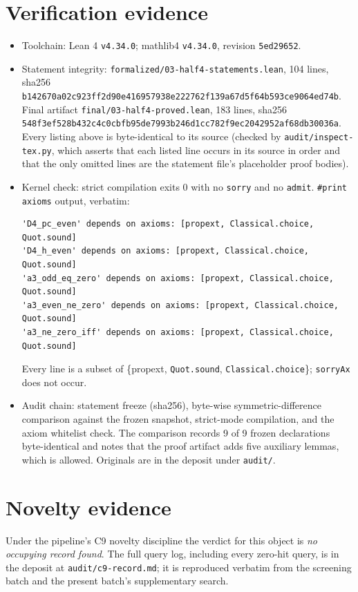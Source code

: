 \documentclass[11pt]{article}
\begin{document}
\section{Verification evidence}
\label{sec:verif}
\begin{itemize}
\item Toolchain: Lean 4 \texttt{v4.34.0}; mathlib4 \texttt{v4.34.0}, revision \texttt{5ed29652}.
\item Statement integrity: \texttt{formalized/03-half4-statements.lean}, 104 lines,
sha256 \texttt{b142670a02c923ff2d90e416957938e222762f139a67d5f64b593ce9064ed74b}.
Final artifact \texttt{final/03-half4-proved.lean}, 183 lines,
sha256 \texttt{548f3ef528b432c4c0cbfb95de7993b246d1cc782f9ec2042952af68db30036a}.
Every listing above is byte-identical to its source (checked by \texttt{audit/inspect-tex.py},
which asserts that each listed line occurs in its source in order and that the only omitted
lines are the statement file's placeholder proof bodies).
\item Kernel check: strict compilation exits 0 with no \texttt{sorry} and no \texttt{admit}.
\texttt{\#print axioms} output, verbatim:
\begin{verbatim}
'D4_pc_even' depends on axioms: [propext, Classical.choice, Quot.sound]
'D4_h_even' depends on axioms: [propext, Classical.choice, Quot.sound]
'a3_odd_eq_zero' depends on axioms: [propext, Classical.choice, Quot.sound]
'a3_even_ne_zero' depends on axioms: [propext, Classical.choice, Quot.sound]
'a3_ne_zero_iff' depends on axioms: [propext, Classical.choice, Quot.sound]
\end{verbatim}
Every line is a subset of \{propext, \texttt{Quot.sound}, \texttt{Classical.choice}\};
\texttt{sorryAx} does not occur.
\item Audit chain: statement freeze (sha256), byte-wise symmetric-difference comparison against
the frozen snapshot, strict-mode compilation, and the axiom whitelist check. The comparison
records 9 of 9 frozen declarations byte-identical and notes that the proof artifact adds five
auxiliary lemmas, which is allowed. Originals are in the deposit under \texttt{audit/}.
\end{itemize}

\section{Novelty evidence}
Under the pipeline's C9 novelty discipline the verdict for this object is \emph{no occupying
record found}. The full query log, including every zero-hit query, is in the deposit at
\texttt{audit/c9-record.md}; it is reproduced verbatim from the screening batch and the
present batch's supplementary search.
\end{document}
